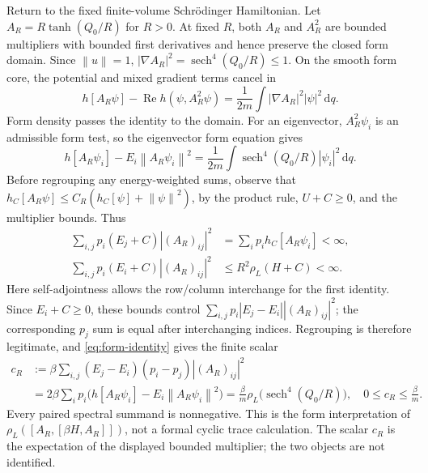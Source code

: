 \documentclass[11pt]{article}
\numberwithin{equation}{section}
\theoremstyle{definition}
\newcommand{\dd}{\,\mathrm d}
\newcommand{\norm}[1]{\left\lVert#1\right\rVert}
\begin{document}
Return to the fixed finite-volume Schr\"odinger Hamiltonian.  Let
$A_R=R\tanh(Q_0/R)$ for $R>0$.  At fixed $R$, both $A_R$ and $A_R^2$
are bounded multipliers with bounded first derivatives and hence preserve
the closed form domain.  Since $\norm{u}=1$,
$|\nabla A_R|^2=\operatorname{sech}^4(Q_0/R)\leq1$.
On the smooth form core, the potential and mixed gradient terms cancel in
\[
 h[A_R\psi]-\operatorname{Re}h(\psi,A_R^2\psi)
 =\frac1{2m}\int |\nabla A_R|^2|\psi|^2\dd q.
\]
Form density passes the identity to the domain.  For an eigenvector,
$A_R^2\psi_i$ is an admissible form test, so the eigenvector form equation
gives
\begin{equation}
 h[A_R\psi_i]-E_i\norm{A_R\psi_i}^2
 =\frac1{2m}\int \operatorname{sech}^4(Q_0/R)|\psi_i|^2\dd q.
 \label{eq:form-identity}
\end{equation}
Before regrouping any energy-weighted sums, observe that
$h_C[A_R\psi]\leq C_R(h_C[\psi]+\norm{\psi}^2)$, by the product
rule, $U+C\geq0$, and the multiplier bounds.  Thus
\begin{align}
 \sum_{i,j}p_i(E_j+C)|(A_R)_{ij}|^2
  &=\sum_i p_i h_C[A_R\psi_i]<\infty,\nonumber\\
 \sum_{i,j}p_i(E_i+C)|(A_R)_{ij}|^2
  &\leq R^2\rho_L(H+C)<\infty.
 \label{eq:collective-absolute-energy-sums}
\end{align}
Here self-adjointness allows the row/column interchange for the first
identity.  Since $E_i+C\geq0$, these bounds control
$\sum_{i,j}p_i|E_j-E_i||(A_R)_{ij}|^2$; the corresponding $p_j$ sum
is equal after interchanging indices.  Regrouping is therefore legitimate,
and \eqref{eq:form-identity} gives the finite scalar
\begin{align}
 c_R&:=\beta\sum_{i,j}(E_j-E_i)(p_i-p_j)|(A_R)_{ij}|^2\nonumber\\
 &=2\beta\sum_i p_i\big(h[A_R\psi_i]-E_i\norm{A_R\psi_i}^2\big)
 =\frac\beta m\rho_L\big(\operatorname{sech}^4(Q_0/R)\big),
 \quad 0\leq c_R\leq\frac\beta m.
 \label{eq:collective-local-c}
\end{align}
Every paired spectral summand is nonnegative.  This is the form
interpretation of $\rho_L([A_R,[\beta H,A_R]])$, not a formal cyclic trace
calculation.  The scalar $c_R$ is the expectation of the displayed bounded
multiplier; the two objects are not identified.
\end{document}
